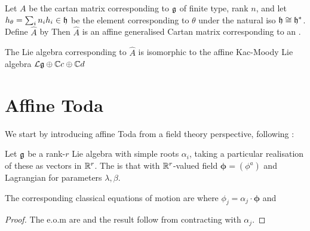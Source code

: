 \documentclass{article}
\begin{document}
\begin{prop}
	Let $A$ be the cartan matrix corresponding to $\mathfrak{g}$ of finite type, rank $n$, and let $h_\theta = \sum_i n_i h_i\in \mathfrak{h}$ be the element corresponding to $\theta$ under the natural iso $\mathfrak{h} \cong \mathfrak{h}^\ast$. Define $\hat{A}$ by 
Then $\hat{A}$ is an affine generalised Cartan matrix corresponding to an .  
\end{prop}

\begin{prop}
	The Lie algebra corresponding to $\hat{A}$ is isomorphic to the affine Kac-Moody Lie algebra $\mathcal{L}\mathfrak{g} \oplus \mathbb{C}c \oplus \mathbb{C}d$
\end{prop}

\section{Affine Toda}
 We start by introducing affine Toda from a field theory perspective, following \cite{Braden1990}:
 
\begin{definition}
	Let $\mathfrak{g}$ be a rank-$r$ Lie algebra with simple roots $\alpha_i$, taking a particular realisation of these as vectors in $\mathbb{R}^r$. The  is that with $\mathbb{R}^r$-valued field $\bm{\phi} = (\phi^a)$ and Lagrangian 
for parameters $\lambda,\beta$.
\end{definition}

\begin{prop}
	The corresponding classical equations of motion are 
where $\phi_j = \alpha_j \cdot \bm{\phi}$ and 
\end{prop}
\begin{proof}
	The e.o.m are 
and the result follow from contracting with $\alpha_j$.
\end{proof}
\end{document}
